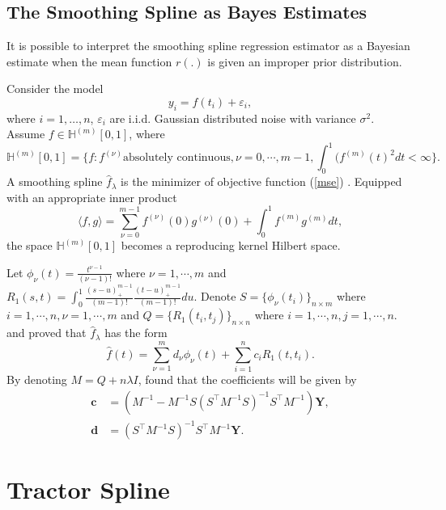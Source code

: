 \subsection{The Smoothing Spline as Bayes Estimates}
It is possible to interpret the smoothing spline regression estimator as a Bayesian estimate when the mean function $r( .)$ is given an improper prior distribution. \cite{berlinet2011reproducing}
\cite{wahba1990spline}


Consider the model
\begin{equation}
y_i=f(t_i)+\varepsilon_i, 
\end{equation}
where $i=1, \dots, n$, $\varepsilon_i$ are i.i.d. Gaussian distributed noise with variance $\sigma^2$. Assume $f\in \mathbb{H}^{(m)}[0,1]$, where
\begin{equation}
\mathbb{H}^{(m)}[0,1]=\{f:f^{(\nu)} \mbox{absolutely continuous}, \nu=0,\cdots,m-1, \int_{0}^{1} (f^{(m)}(t)^2dt<\infty \}.
\end{equation}
A smoothing spline $\hat{f}_\lambda$ is the minimizer of objective function (\ref{mse}) \cite{wang1998smoothing}. Equipped with an appropriate inner product
\begin{equation}
\langle f,g\rangle=\sum_{\nu=0}^{m-1}f^{(\nu)}(0)g^{(\nu)}(0)+\int_{0}^{1}f^{(m)}g^{(m)}dt,
\end{equation}
the space $\mathbb{H}^{(m)}[0,1]$ becomes a reproducing kernel Hilbert space.

Let $\phi_\nu (t)=\frac{t^{\nu-1}}{(\nu-1)!}$ where $\nu=1, \cdots, m$ and $R_1(s,t)=\int_0^1\frac{ (s-u)_+^{m-1}}{(m-1)!} \frac{ (t-u)_+^{m-1}}{(m-1)!} du$. Denote $S=\{\phi_\nu (t_i) \}_{n\times m}$ where $i=1, \cdots, n, \nu=1, \cdots, m$ and $Q=\{ R_1(t_i,t_j)\}_{n\times n}$ where $i=1, \cdots, n, j=1, \cdots, n$. \cite{kimeldorf1971some} and \cite{kimeldorf1970correspondence}  proved that $\hat{f}_\lambda$ has the form
\begin{equation}
\hat{f}(t)=\sum_{\nu=1}^m d_\nu \phi_\nu(t)+\sum_{i=1}^n c_iR_1(t,t_i).
\end{equation}
By denoting $M=Q+n\lambda I$, \cite{gubook} found that the coefficients will be given by
\begin{align}
\mathbf{c}&=(M^{-1}-M^{-1}S(S^\top M^{-1}S)^{-1}S^\top M^{-1})\mathbf{Y},\\
\mathbf{d}&=(S^\top M^{-1}S)^{-1}S^\top M^{-1}\mathbf{Y}.
\end{align}


\section{Tractor Spline}

